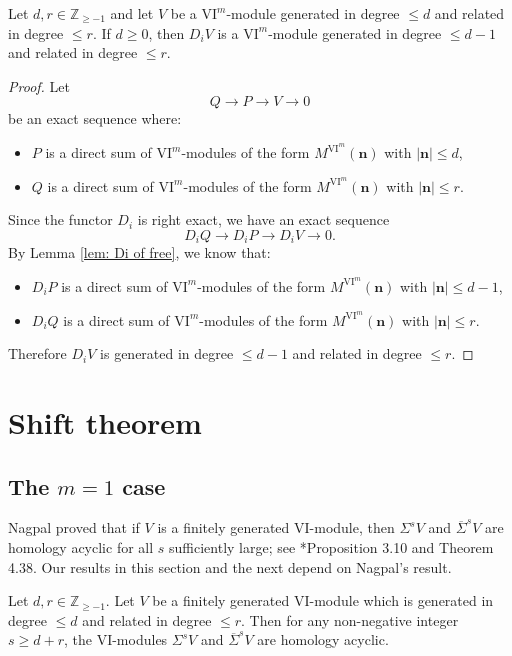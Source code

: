 \documentclass{amsart}
\numberwithin{equation}{section}
\newcommand{\VI}{{\mathrm{VI}}}
\newcommand{\ZZ}{{\mathbb{Z}_{\geqslant -1}}}
\newcommand{\SSigma}{{\overline{\Sigma}}}
\begin{document}
\begin{lemma} \label{lem:degD2}
   Let $d,r\in\ZZ$ and let $V$ be a $\VI^m$-module generated in degree $\leqslant d$ and related in degree $\leqslant r$. If $d\geqslant 0$, then $D_i V$ is a $\VI^m$-module generated in degree $\leqslant d-1$ and related in degree $\leqslant r$. 
\end{lemma}

\begin{proof}
   Let 
   \[ Q \to P \to V \to 0 \]
   be an exact sequence where: 
   \begin{itemize}
      \item $P$ is a direct sum of $\VI^m$-modules of the form $M^{\VI^m}(\mathbf{n})$ with $|\mathbf{n}|\leqslant d$, 
      \item $Q$ is a direct sum of $\VI^m$-modules of the form $M^{\VI^m}(\mathbf{n})$ with $|\mathbf{n}|\leqslant r$. 
   \end{itemize}
   Since the functor $D_i$ is right exact, we have an exact sequence 
   \[ D_i Q \to D_i P \to D_i V \to 0. \]
   By Lemma \ref{lem: Di of free}, we know that:
   \begin{itemize}
      \item $D_i P$ is a direct sum of $\VI^m$-modules of the form $M^{\VI^m}(\mathbf{n})$ with $|\mathbf{n}|\leqslant d-1$, 
      \item $D_i Q$ is a direct sum of $\VI^m$-modules of the form $M^{\VI^m}(\mathbf{n})$ with $|\mathbf{n}|\leqslant r$. 
   \end{itemize}
   Therefore $D_i V$ is generated in degree $\leqslant d-1$ and related in degree $\leqslant r$.
\end{proof}


\section{Shift theorem} \label{sec: shift theorem}


\subsection{The $m=1$ case}
Nagpal proved that if $V$ is a finitely generated $\VI$-module, then $\Sigma^s V$ and $\SSigma^s V$ are homology acyclic for all $s$ sufficiently large; see \cite{na}*{Proposition 3.10 and Theorem 4.38}. Our results in this section and the next depend on Nagpal's result. 

\begin{lemma} \label{lem: shift thm base case}
  Let $d, r\in \ZZ$. Let $V$ be a finitely generated $\VI$-module which is generated in degree $\leqslant d$ and related in degree $\leqslant r$. Then for any non-negative integer $s\geqslant d+r$, the $\VI$-modules $\Sigma^s V$ and $\SSigma^s V$ are homology acyclic. 
\end{lemma}
\end{document}
